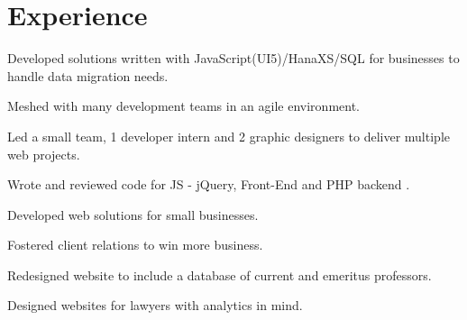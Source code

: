 \documentclass[]{deedy-resume-openfont}
\begin{document}
\hfill
\begin{minipage}[t]{0.66\textwidth} 


\section{Experience}
\vspace{\topsep} %
\vspace{\topsep} %
\begin{tightemize}
\item Developed solutions written with JavaScript(UI5)/HanaXS/SQL for businesses to handle data migration needs.
\item Meshed with many development teams in an agile environment.
\end{tightemize}
\sectionsep

\vspace{\topsep} %
\begin{tightemize}
\item Led a small team, 1 developer intern and 2 graphic designers to deliver multiple web projects.
\item Wrote and reviewed code for JS - jQuery, Front-End and PHP backend .
\end{tightemize}
\sectionsep

\begin{tightemize}
\item Developed web solutions for small businesses.
\item Fostered client relations to win more business.
\item Redesigned website to include a database of current and emeritus professors.
\item Designed websites for lawyers with analytics in mind.
\end{tightemize}
\sectionsep



\end{minipage}
\end{document}
